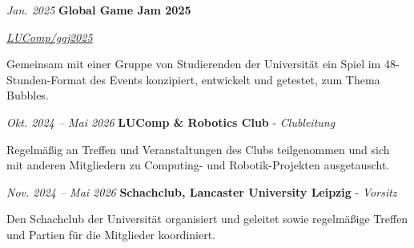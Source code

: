 \documentclass[german]{cv}
\begin{document}
        \vspace{0.13 cm}

        \begin{twocolentry}{
        \textit{Jan. 2025}}
            \textbf{Global Game Jam 2025}

            \textit{\href{https://github.com/LUComp/ggj2025}{LUComp/ggj2025}}
        \end{twocolentry}

        \vspace{0.10 cm}
        \begin{onecolentry}
            \begin{highlights}
                \item Gemeinsam mit einer Gruppe von Studierenden der Universität ein Spiel im 48-Stunden-Format des Events konzipiert, entwickelt und getestet, zum Thema \glqq Bubbles\grqq.
            \end{highlights}
        \end{onecolentry}

        \vspace{0.13 cm}

        \begin{twocolentry}{
        \textit{Okt. 2024 – Mai 2026}}
            \textbf{LUComp \& Robotics Club} - \textit{Clubleitung}
        \end{twocolentry}

        \vspace{0.10 cm}
        \begin{onecolentry}
            \begin{highlights}
                \item Regelmäßig an Treffen und Veranstaltungen des Clubs teilgenommen und sich mit anderen Mitgliedern zu Computing- und Robotik-Projekten ausgetauscht.
            \end{highlights}
        \end{onecolentry}

        \vspace{0.13 cm}

        \begin{twocolentry}{
        \textit{Nov. 2024 – Mai 2026}}
            \textbf{Schachclub, Lancaster University Leipzig} - \textit{Vorsitz}
        \end{twocolentry}

        \vspace{0.10 cm}
        \begin{onecolentry}
            \begin{highlights}
                \item Den Schachclub der Universität organisiert und geleitet sowie regelmäßige Treffen und Partien für die Mitglieder koordiniert.
            \end{highlights}
        \end{onecolentry}
\end{document}
